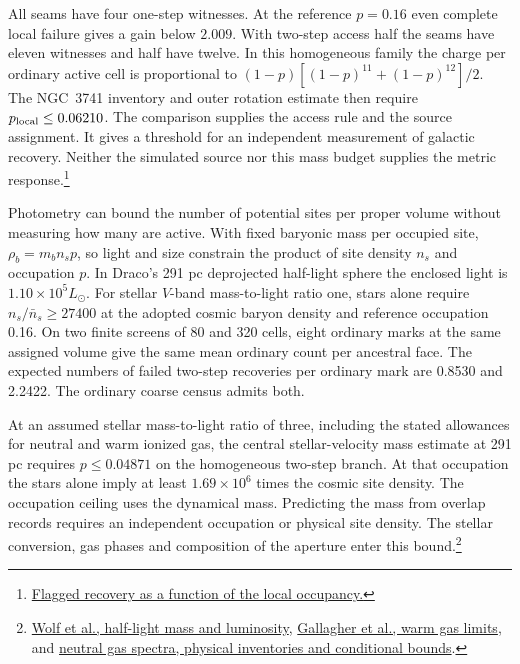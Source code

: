 \documentclass[11pt]{article}
\begin{document}
All seams have four one-step witnesses. At the reference $p=0.16$ even
complete local failure gives a gain below $2.009$. With two-step access
half the seams have eleven witnesses and half have twelve. In this
homogeneous family the charge per ordinary active cell is proportional
to $(1-p)[(1-p)^{11}+(1-p)^{12}]/2$. The NGC~3741 inventory and
outer rotation estimate then require $p_{\rm local}\le0.06210$. The
comparison supplies the access rule and the source assignment. It gives
a threshold for an independent measurement of galactic recovery.
Neither the simulated source nor this mass budget supplies the metric
response.\footnote{\href{https://github.com/FloatingPragma/observer-patch-holography/tree/main/openwave/interval_echo/row_19/recovery_identity}{Flagged recovery as a function of the local occupancy.}}

Photometry can bound the number of potential sites per proper volume
without measuring how many are active. With fixed baryonic mass per
occupied site, $\rho_b=m_b n_s p$, so light and size constrain the
product of site density $n_s$ and occupation $p$. In Draco's 291 pc
deprojected half-light sphere the enclosed light is
$1.10\times10^5 L_\odot$. For stellar $V$-band mass-to-light ratio one,
stars alone require $n_s/\bar n_s\ge 27400$ at the adopted cosmic
baryon density and reference occupation 0.16. On two finite screens
of 80 and 320 cells, eight ordinary marks at the same assigned volume
give the same mean ordinary count per ancestral face. The expected
numbers of failed two-step recoveries per ordinary mark are 0.8530 and
2.2422. The ordinary coarse census admits both.

At an assumed stellar mass-to-light ratio of three, including the stated
allowances for neutral and warm ionized gas, the central stellar-velocity
mass estimate at 291 pc requires $p\le0.04871$ on the homogeneous
two-step branch. At that occupation the stars alone imply at least
$1.69\times10^6$ times the cosmic site density. The occupation ceiling
uses the dynamical mass. Predicting the mass from overlap records
requires an independent occupation or physical site density. The
stellar conversion, gas phases and composition of the aperture enter
this bound.\footnote{\href{https://arxiv.org/abs/0908.2995}{Wolf et al., half-light mass and luminosity},
\href{https://arxiv.org/abs/astro-ph/0301228}{Gallagher et al., warm gas limits}, and
\href{https://github.com/FloatingPragma/observer-patch-holography/tree/main/code/cosmology/record_abundance}{neutral gas spectra, physical inventories and conditional bounds}.}
\end{document}
